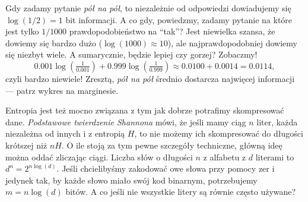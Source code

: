 \documentclass[10pt,a4paper]{article}
\begin{document}
%
Gdy zadamy pytanie \emph{pół na pół}, to niezależnie od odpowiedzi dowiadujemy się $\log(1/2)=1$ bit informacji.
A co gdy, powiedzmy, zadamy pytanie na które jest tylko $1/1000$ prawdopodobieństwo na ``tak''?
Jest niewielka szansa, że dowiemy się bardzo dużo ($\log(1000)\approx 10$), ale najprawdopodobniej dowiemy się niezbyt wiele.
A sumarycznie, będzie lepiej czy gorzej? Zobaczmy!
%
\begin{equation}
    0.001 \log(\tfrac{1}{0.001}) + 0.999 \log(\tfrac{1}{0.999})\approx 0.0100 + 0.0014 = 0.0114,
\end{equation}
%
czyli bardzo niewiele!
Zresztą, \emph{pół na pół} średnio dostarcza najwięcej informacji --- patrz wykres na marginesie. 


Entropia jest też mocno związana z tym jak dobrze potrafimy skompresować dane.
\emph{Podstawowe twierdzenie Shannona} mówi, że jeśli mamy ciąg $n$ liter,
każda niezależna od innych i z entropią $H$, to nie możemy ich skompresować do długości krótszej niż $n H$.
O ile stoją za tym pewne szczegóły techniczne, główną ideę można oddać zliczając ciągi.
Liczba słów o długości $n$ z alfabetu z $d$ literami to $d^n=2^{n \log(d)}$.
Jeśli chcielibyśmy zakodować owe słowa przy pomocy zer i jedynek
tak, by każde słowo miało swój kod binarnym, potrzebujemy $m = n \log(d)$ bitów.
%
%
A co jeśli nie wszystkie litery są równie często używane?
\end{document}
